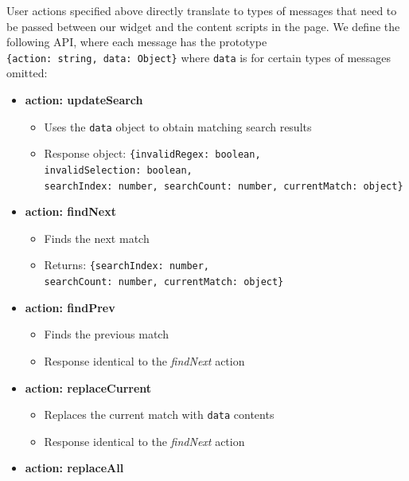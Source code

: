 \documentclass[bsc,frontabs,twoside,singlespacing,parskip,deptreport]{infthesis}
\providecommand{\tightlist}{%
  \setlength{\itemsep}{0pt}\setlength{\parskip}{0pt}}
\begin{document}
User actions specified above directly translate to types of messages
that need to be passed between our widget and the content scripts in the page. We define the following API, where each message has the prototype \texttt{\{action:\ string,\ data:\ Object\}} where \texttt{data} is for certain types of messages omitted:

\begin{itemize}
\tightlist

\item\textbf{action: updateSearch}

\begin{itemize}
\tightlist
\item
  Uses the \texttt{data} object to obtain matching search results
\item
  Response object:
  \texttt{\{invalidRegex:\ boolean, invalidSelection:\ boolean,\\ searchIndex:\ number, searchCount:\ number, currentMatch:\ object\}}
\end{itemize}

\item\textbf{action: findNext}

\begin{itemize}
\tightlist
\item
  Finds the next match
\item
  Returns:
  \texttt{\{searchIndex:\ number, searchCount:\ number,\ currentMatch:\ object\}}
\end{itemize}

\item\textbf{action: findPrev}

\begin{itemize}
\tightlist
\item
  Finds the previous match
\item
  Response identical to the \textit{findNext} action
\end{itemize}

\item\textbf{action: replaceCurrent}

\begin{itemize}
\tightlist
\item
  Replaces the current match with \texttt{data} contents
\item
  Response identical to the \textit{findNext} action
\end{itemize}

\item\textbf{action: replaceAll}


\end{itemize}
\end{document}

